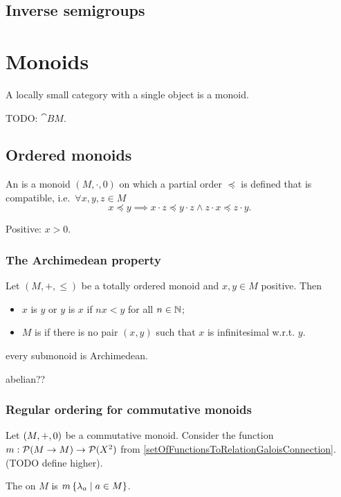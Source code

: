 \subsection{Inverse semigroups}

\section{Monoids}


\begin{lemma}
A locally small category with a single object is a monoid.
\end{lemma}
TODO:  $\cat{B}M$.


\subsection{Ordered monoids}
\begin{definition}
An  is a monoid $(M, \cdot, 0)$ on which a partial order $\preceq$ is defined that is compatible, i.e.\ $\forall x,y,z\in M$
\[ x\preceq y \implies x\cdot z \preceq y \cdot z \land z\cdot x \preceq z \cdot y. \]

Positive: $x > 0$.
\end{definition}

\subsubsection{The Archimedean property}
\begin{definition}
Let $(M,+,\leq)$ be a totally ordered monoid and $x,y\in M$ positive. Then
\begin{itemize}
\item $x$ is  $y$ or $y$ is  $x$ if $nx<y$ for all $n\in\mathbb{N}$;
\item $M$ is  if there is no pair $(x,y)$ such that $x$ is infinitesimal w.r.t. $y$.
\end{itemize}
\end{definition}
every submonoid is Archimedean.

abelian??

\subsubsection{Regular ordering for commutative monoids}
\begin{definition}
Let $\left( M,+,0 \right)$ be a commutative monoid. Consider the function $m: \operatorname{\mathcal{P}}(M\to M) \to \operatorname{\mathcal{P}}(X^2)$ from \ref{setOfFunctionsToRelationGaloisConnection}. (TODO define higher).

The  on $M$ is $m\left\{ \lambda_a \;\middle|\; a\in M \right\}$.
\end{definition}

